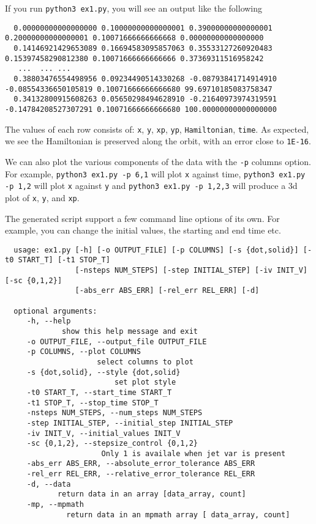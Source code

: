 \documentclass[10pt]{article}
\theoremstyle{remark}
\begin{document}
If you run \verb+python3 ex1.py+, you will see an output like the following
{
\tiny

\begin{verbatim}
  0.00000000000000000 0.10000000000000001 0.39000000000000001 0.20000000000000001 0.10071666666666668 0.00000000000000000
  0.14146921429653089 0.16694583095857063 0.35533127260920483 0.15397458290812380 0.10071666666666666 0.37369311516958242
   ...  ... ...
  0.38803476554498956 0.09234490514330268 -0.08793841714914910 -0.08554336650105819 0.10071666666666680 99.69710185083758347
  0.34132800915608263 0.05650298494628910 -0.21640973974319591 -0.14784208527307291 0.10071666666666680 100.00000000000000000
\end{verbatim}
}

The values of each row consists of: \verb+x+, \verb+y+, \verb+xp+,
\verb+yp+, \verb+Hamiltonian+, \verb+time+. As expected, we see the
Hamiltonian is preserved along the orbit, with an error close to
\verb+1E-16+.

\vspace{4mm}

We can also plot the various components of the data with the \verb+-p+
columns option. For example, \verb+python3 ex1.py -p 6,1+ will plot \verb+x+
against time, \verb+python3 ex1.py -p 1,2+ will plot \verb+x+ against \verb+y+ and
\verb+python3 ex1.py -p 1,2,3+ will produce a 3d plot of
\verb+x+, \verb+y+, and \verb+xp+.

\vspace{4mm}

The generated script support a few command line options of its
own. For example, you can change the initial values, the starting and
end time etc.
\begin{verbatim}
  usage: ex1.py [-h] [-o OUTPUT_FILE] [-p COLUMNS] [-s {dot,solid}] [-t0 START_T] [-t1 STOP_T] 
                [-nsteps NUM_STEPS] [-step INITIAL_STEP] [-iv INIT_V] [-sc {0,1,2}] 
                [-abs_err ABS_ERR] [-rel_err REL_ERR] [-d]

  optional arguments:
     -h, --help            
             show this help message and exit
     -o OUTPUT_FILE, --output_file OUTPUT_FILE
     -p COLUMNS, --plot COLUMNS
                     select columns to plot
     -s {dot,solid}, --style {dot,solid}
                         set plot style
     -t0 START_T, --start_time START_T
     -t1 STOP_T, --stop_time STOP_T
     -nsteps NUM_STEPS, --num_steps NUM_STEPS
     -step INITIAL_STEP, --initial_step INITIAL_STEP
     -iv INIT_V, --initial_values INIT_V
     -sc {0,1,2}, --stepsize_control {0,1,2}
                      Only 1 is availale when jet var is present
     -abs_err ABS_ERR, --absolute_error_tolerance ABS_ERR
     -rel_err REL_ERR, --relative_error_tolerance REL_ERR
     -d, --data            
            return data in an array [data_array, count]
     -mp, --mpmath         
              return data in an mpmath array [ data_array, count]
\end{verbatim}
\end{document}
